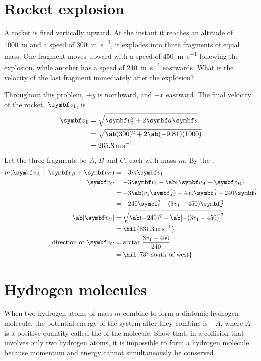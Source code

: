 \section{Rocket explosion}
\begin{problem}
  A rocket is fired vertically upward. At the instant it reaches an
  altitude of \qty{1000}{\metre} and a
  speed of \qty{300}{\metre\per\second}, it explodes into three
  fragments of equal mass. One fragment moves
  upward with a speed of \qty{450}{\metre\per\second} following the
  explosion, while another has a speed of
  \qty{240}{\metre\per\second} eastwards. What is the velocity of the
  last fragment immediately after the explosion?
\end{problem}

Throughout this problem, \(+y\) is northward, and \(+x\) eastward.
The final velocity of the rocket, \(\mv{v}_1\), is
\begin{align*}
  \mv{v}_1 &= \sqrt{\mv{v}_0^2 + 2\mv{a}\mv{s}}\\
  &= \sqrt{\ab(300)^2 + 2\ab(-9.81)(1000)} \\
  &= \qty{265.3}{\metre\per\second}
\end{align*}
Let the three fragments be \(A\), \(B\) and \(C\), each with mass
\(m\). By the ,
\begin{align*}
  m(\mv{v}_A + \mv{v}_B + \mv{v}_C) &= -3m\mv{v}_1 \\
  \mv{v}_C &= -3\mv{v}_1 - \ab(\mv{v}_A + \mv{v}_B) \\
  &= -3\ab(v_1\jj) - 450\jj - 240\ii \\
  &= -240\ii - (3v_1 + 450)\jj \\
  \ab|\mv{v}_C| &= \sqrt{\ab(-240)^2 + \ab[-(3v_1+450)]^2}\\
  &= \hil{\qty{831.3}{\metre\per\second}} \\
  \text{direction of } \mv{v}_C &= \arctan\f{3v_1 +450}{240} \\
  &= \hil{\qty{73}{\degree}\text{ south of west}}
\end{align*}

\section{Hydrogen molecules}
\begin{problem}
  When two hydrogen atoms of mass \(m\) combine to form a diatomic
  hydrogen molecule,
  the potential energy of the system after they combine is \(-A\),
  where \(A\) is a positive quantity called the
   of the molecule.
  Show that, in a collision that involves only two hydrogen atoms, it
  is impossible to form a hydrogen molecule because momentum and energy
  cannot simultaneously be conserved.
\end{problem}

